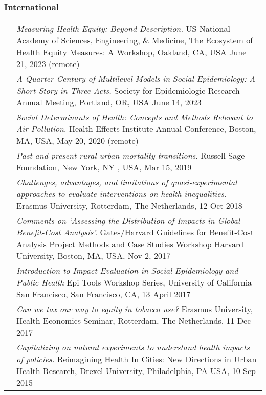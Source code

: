 \documentclass[
  letterpaper,
  DIV=11,
  numbers=noendperiod]{scrartcl}
\begin{document}
\subsubsection{International}\label{international-1}

\begin{longtable}[]{@{}
  >{\raggedright\arraybackslash}p{}
  >{\raggedright\arraybackslash}p{}@{}}
\toprule\noalign{}
\endhead
\bottomrule\noalign{}
\endlastfoot
2023 & \emph{Measuring Health Equity: Beyond Description.} US National
Academy of Sciences, Engineering, \& Medicine, The Ecosystem of Health
Equity Measures: A Workshop, Oakland, CA, USA June 21, 2023 (remote) \\
2023 & \emph{A Quarter Century of Multilevel Models in Social
Epidemiology: A Short Story in Three Acts.} Society for Epidemiologic
Research Annual Meeting, Portland, OR, USA June 14, 2023 \\
2020 & \emph{Social Determinants of Health: Concepts and Methods
Relevant to Air Pollution}. Health Effects Institute Annual Conference,
Boston, MA, USA, May 20, 2020 (remote) \\
2019 & \emph{Past and present rural-urban mortality transitions}.
Russell Sage Foundation, New York, NY , USA, Mar 15, 2019 \\
2018 & \emph{Challenges, advantages, and limitations of
quasi-experimental approaches to evaluate interventions on health
inequalities}. Erasmus University, Rotterdam, The Netherlands, 12 Oct
2018 \\
2017 & \emph{Comments on `Assessing the Distribution of Impacts in
Global Benefit-Cost Analysis'.} Gates/Harvard Guidelines for
Benefit-Cost Analysis Project Methods and Case Studies Workshop Harvard
University, Boston, MA, USA, Nov 2, 2017 \\
2017 & \emph{Introduction to Impact Evaluation in Social Epidemiology
and Public Health} Epi Tools Workshop Series, University of California
San Francisco, San Francisco, CA, 13 April 2017 \\
2017 & \emph{Can we tax our way to equity in tobacco use?} Erasmus
University, Health Economics Seminar, Rotterdam, The Netherlands, 11 Dec
2017 \\
2015 & \emph{Capitalizing on natural experiments to understand health
impacts of policies.} Reimagining Health In Cities: New Directions in
Urban Health Research, Drexel University, Philadelphia, PA USA, 10 Sep
2015 \\

\end{longtable}
\end{document}
